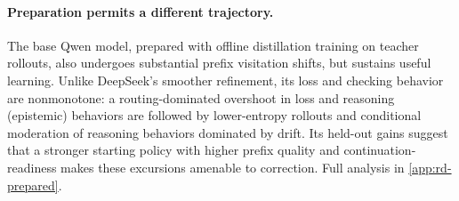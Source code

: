 \paragraph{Preparation permits a different trajectory.}
The base Qwen model, prepared with offline distillation training on teacher rollouts, also undergoes substantial prefix visitation shifts, but sustains useful learning. Unlike DeepSeek's smoother refinement, its loss and checking behavior are nonmonotone: a routing-dominated overshoot in loss and reasoning (epistemic) behaviors are followed by lower-entropy rollouts and conditional moderation of reasoning behaviors dominated by drift. Its held-out gains suggest that a stronger starting policy with higher prefix quality and continuation-readiness makes these excursions amenable to correction. Full analysis in \cref{app:rd-prepared}.
